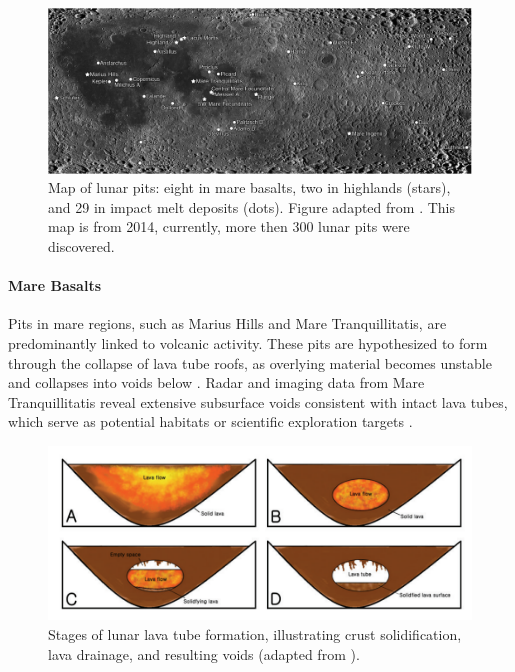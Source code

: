 \begin{figure}[H]
    \centering
    \includegraphics[width=0.98\linewidth]{map-lunar-pits-rough.png}
    \caption{Map of lunar pits: eight in mare basalts, two in highlands (stars), and 29 in impact melt deposits (dots). Figure adapted from \cite{lunar-pit-distribution}. This map is from 2014, currently, more then 300 lunar pits were discovered.}
    \label{fig:map-lunar-pits}
\end{figure}

\paragraph{Mare Basalts}
Pits in mare regions, such as Marius Hills and Mare Tranquillitatis, are predominantly linked to volcanic activity. These pits are hypothesized to form through the collapse of lava tube roofs, as overlying material becomes unstable and collapses into voids below \cite{lunar-pits-entrances-to-caves, radar-observations-lava-tubes}. Radar and imaging data from Mare Tranquillitatis reveal extensive subsurface voids consistent with intact lava tubes, which serve as potential habitats or scientific exploration targets \cite{Carrer2024, radar-observations-lava-tubes}.

\begin{figure}[H]
    \centering
    \includegraphics[width=0.7\linewidth]{lava_tube_formation_schema.png}
    \caption{Stages of lunar lava tube formation, illustrating crust solidification, lava drainage, and resulting voids (adapted from \cite{lunar-pits-entrances-to-caves}).}
    \label{fig:lava-tube-formation-schema}
\end{figure}

